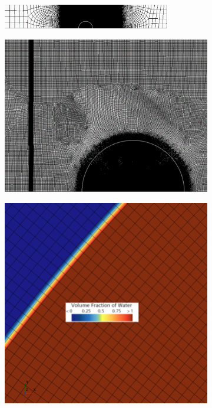 \documentclass{UCF_ETD}
\begin{document}
\begin{figure}
\centering
    \begin{subfigure}[b]{\textwidth}
        \centering
        \includegraphics[width=0.8\textwidth]{Figures/mesh.png}
        \caption{}
        \label{subfig:mesh_zoomed_out}
    \end{subfigure}
        \begin{subfigure}[]{0.49\textwidth}
        \centering
        \includegraphics[width=\textwidth]{Figures/zoomed-in_mesh.png}
        \caption{}
        \label{subfig:mesh_shock}
    \end{subfigure}
        \begin{subfigure}[]{0.49\textwidth}
        \centering
        \includegraphics[scale=0.55]{Figures/mesh_alignment.png}

\end{subfigure}
\end{figure}
\end{document}
